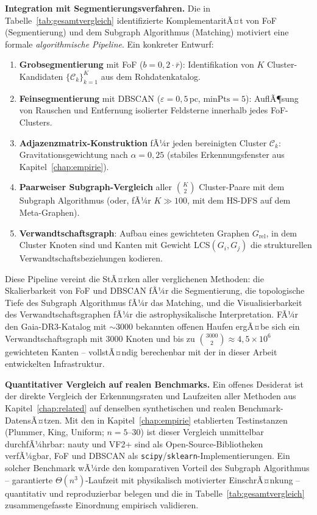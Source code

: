 ﻿\documentclass[a4paper,12pt]{report}
\theoremstyle{definition}
\begin{document}
\textbf{Integration mit Segmentierungsverfahren.} Die in Tabelle~\ref{tab:gesamtvergleich} identifizierte KomplementaritÃ¤t von FoF (Segmentierung) und dem Subgraph Algorithmus (Matching) motiviert eine formale \emph{algorithmische Pipeline}. Ein konkreter Entwurf:

\begin{enumerate}
    \item \textbf{Grobsegmentierung} mit FoF ($b = 0{,}2 \cdot \bar{r}$): Identifikation von $K$ Cluster-Kandidaten $\{\mathcal{C}_k\}_{k=1}^K$ aus dem Rohdatenkatalog.
    \item \textbf{Feinsegmentierung} mit DBSCAN ($\varepsilon = 0{,}5\,\mathrm{pc}$, $\mathrm{minPts} = 5$): AuflÃ¶sung von Rauschen und Entfernung isolierter Feldsterne innerhalb jedes FoF-Clusters.
    \item \textbf{Adjazenzmatrix-Konstruktion} fÃ¼r jeden bereinigten Cluster $\mathcal{C}_k$: Gravitationsgewichtung nach $\alpha = 0{,}25$ (stabiles Erkennungsfenster aus Kapitel~\ref{chap:empirie}).
    \item \textbf{Paarweiser Subgraph-Vergleich} aller $\binom{K}{2}$ Cluster-Paare mit dem Subgraph Algorithmus (oder, fÃ¼r $K \gg 100$, mit dem HS-DFS auf dem Meta-Graphen).
    \item \textbf{Verwandtschaftsgraph}: Aufbau eines gewichteten Graphen $G_\mathrm{rel}$, in dem Cluster Knoten sind und Kanten mit Gewicht LCS$(G_i, G_j)$ die strukturellen Verwandtschaftsbeziehungen kodieren.
\end{enumerate}

Diese Pipeline vereint die StÃ¤rken aller verglichenen Methoden: die Skalierbarkeit von FoF und DBSCAN fÃ¼r die Segmentierung, die topologische Tiefe des Subgraph Algorithmus fÃ¼r das Matching, und die Visualisierbarkeit des Verwandtschaftsgraphen fÃ¼r die astrophysikalische Interpretation. FÃ¼r den Gaia-DR3-Katalog mit $\sim 3000$ bekannten offenen Haufen ergÃ¤be sich ein Verwandtschaftsgraph mit $3000$ Knoten und bis zu $\binom{3000}{2} \approx 4{,}5 \times 10^6$ gewichteten Kanten -- vollstÃ¤ndig berechenbar mit der in dieser Arbeit entwickelten Infrastruktur.

\textbf{Quantitativer Vergleich auf realen Benchmarks.} Ein offenes Desiderat ist der direkte Vergleich der Erkennungsraten und Laufzeiten aller Methoden aus Kapitel~\ref{chap:related} auf denselben synthetischen und realen Benchmark-DatensÃ¤tzen. Mit den in Kapitel~\ref{chap:empirie} etablierten Testinstanzen (Plummer, King, Uniform; $n = 5$--$30$) ist dieser Vergleich unmittelbar durchfÃ¼hrbar: nauty und VF2+ sind als Open-Source-Bibliotheken verfÃ¼gbar, FoF und DBSCAN als \texttt{scipy}/\texttt{sklearn}-Implementierungen. Ein solcher Benchmark wÃ¼rde den komparativen Vorteil des Subgraph Algorithmus -- garantierte $\Theta(n^3)$-Laufzeit mit physikalisch motivierter EinschrÃ¤nkung -- quantitativ und reproduzierbar belegen und die in Tabelle~\ref{tab:gesamtvergleich} zusammengefasste Einordnung empirisch validieren.
\end{document}
